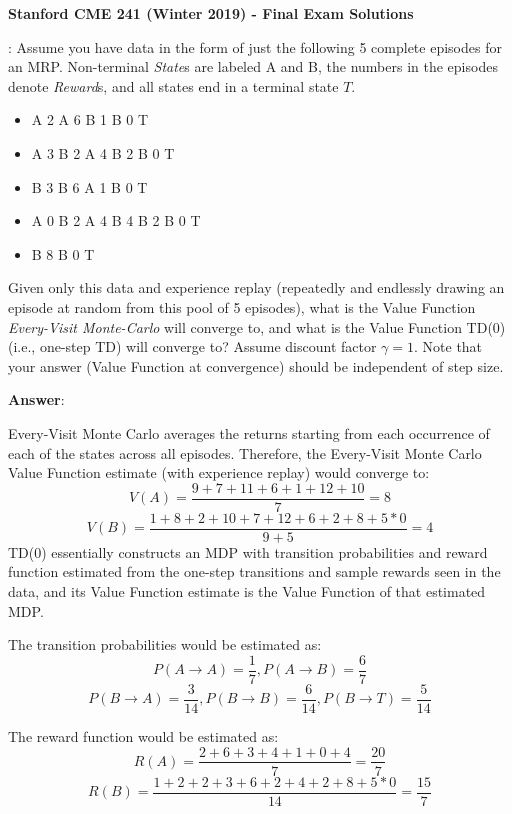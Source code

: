 \documentclass[12pt]{exam}
\begin{document}
\begin{center}
{\large {\bf Stanford CME 241 (Winter 2019) - Final Exam Solutions}}
\end{center}
\vspace{5mm}
 
\begin{questions}
: Assume you have data in the form of just the following 5 complete episodes for an MRP. Non-terminal {\em State}s are labeled A and B, the numbers in the episodes denote {\em Reward}s, and all states end in a terminal state $T$.
\begin{itemize}
\item A 2 A 6 B 1 B 0 T
\item A 3 B 2 A 4 B 2 B 0 T
\item B 3 B 6 A 1 B 0 T
\item A 0 B 2 A 4 B 4 B 2 B 0 T
\item B 8 B 0 T
\end{itemize}
Given only this data and experience replay (repeatedly and endlessly drawing an episode at random from this pool of 5 episodes), what is the Value Function {\em Every-Visit Monte-Carlo} will converge to, and what is the Value Function TD(0) (i.e., one-step TD) will converge to? Assume discount factor $\gamma = 1$. Note that your answer (Value Function at convergence) should be independent of step size.

{\bf Answer}:

Every-Visit Monte Carlo averages the returns starting from each occurrence of each of the states across all episodes. Therefore, the Every-Visit Monte Carlo Value Function estimate (with experience replay) would converge to:
$$V(A) = \frac {9+7+11+6+1+12+10} 7 = 8$$
$$V(B) = \frac {1+8+2+10+7+12+6+2+8+5*0} {9+5} = 4$$
TD(0) essentially constructs an MDP with transition probabilities and reward function estimated from the one-step transitions and sample rewards seen in the data, and its Value Function estimate is the Value Function of that estimated MDP. 

The transition probabilities would be estimated as:
$$P(A\rightarrow A) = \frac 1 7, P(A\rightarrow B) = \frac 6 7$$
$$P(B\rightarrow A) = \frac 3 {14}, P(B \rightarrow B) = \frac 6 {14}, P(B\rightarrow T) = \frac 5 {14}$$

The reward function would be estimated as:
$$R(A) = \frac {2 + 6 + 3 + 4 + 1 + 0 + 4} 7 = \frac {20} 7$$
$$R(B) = \frac {1 + 2 + 2 + 3 + 6 + 2 + 4 + 2 + 8 + 5*0} {14} = \frac {15} 7$$


\end{questions}
\end{document}
